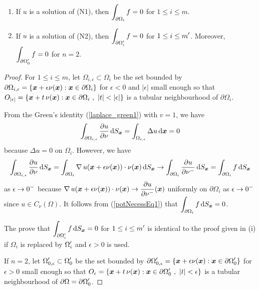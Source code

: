 \begin{prop} \label{pot_nec_Nprobl}
\begin{enumerate}
\item If $u$ is a solution of (N1), then
$\displaystyle \int_{\partial \Omega_i} f =0$ for $1 \leq i \leq m$.
\item If $u$ is a solution of (N2), then
$\displaystyle \int_{\partial \Omega^{\prime}_i} f =0$ for
$\displaystyle 1 \leq i \leq m^{\prime}$.
Moreover, $\displaystyle \int_{\partial \Omega^{\prime}_0} f =0$ for $n=2$.
\end{enumerate}
\end{prop}

\begin{proof}
For $1\leq i \leq m$, let $\Omega_{i,\epsilon} \subset \Omega_i$ be
the set bounded by
$\displaystyle \partial \Omega_{i,\epsilon}
= \{{\bm{x}} + \epsilon \nu({\bm{x}}) : {\bm{x}}
\in \partial \Omega_i \}$ for $\epsilon<0$ and $|\epsilon|$ small
enough so that
$\DS
O_{|\epsilon|} = \left\{ \VEC{x} + t\, \nu(\VEC{x}) : \VEC{x} \in
  \partial \Omega_i \ , \ |t|<|\epsilon| \right\}$ is a tubular
neighbourhood of $\partial \Omega_i$.

From the Green's identity (\ref{laplace_green1}) with $v=1$, we have
\begin{equation} \label{potNecessEq1}
\int_{\partial \Omega_{i,\epsilon}} \frac{\partial{u}}{\partial \nu} \,\mathrm{d}{S}_{{\bm{x}}}
= \int_{\Omega_{i,\epsilon}} \Delta u \,\mathrm{d}{{\bm{x}}} = 0
\end{equation}
because $\Delta u = 0$ on $\Omega_i$.  However, we have
\[
\int_{\partial \Omega_{i,\epsilon}} \frac{\partial{u}}{\partial \nu} \,\mathrm{d}{S}_{{\bm{x}}}
= \int_{\partial \Omega_i} \operatorname{\nabla} u({\bm{x}} + \epsilon \nu({\bm{x}}))
\cdot \nu({\bm{x}}) \,\mathrm{d}{S}_{{\bm{x}}}
\rightarrow \int_{\partial \Omega_i} \frac{\partial{u}}{\partial \nu^-} \,\mathrm{d}{S}_{{\bm{x}}}
= \int_{\partial \Omega_i} f \,\mathrm{d}{S}_{{\bm{x}}}
\]
as $\displaystyle \epsilon \rightarrow 0^-$ because
$\displaystyle
\operatorname{\nabla} u({\bm{x}} + \epsilon \nu({\bm{x}})) \cdot \nu({\bm{x}})
\to \frac{\partial{u}}{\partial \nu^-}({\bm{x}})$ uniformly on $\partial \Omega_i$ as
$\displaystyle \epsilon \to 0^-$ since $u \in C_{\nu}(\Omega)$.  It follows
from (\ref{potNecessEq1}) that
$\displaystyle \int_{\partial \Omega_i} f \,\mathrm{d}{S}_{{\bm{x}}} = 0$.

 The prove that
$\displaystyle \int_{\partial \Omega^{\prime}_i} f \,\mathrm{d}{S}_{{\bm{x}}} = 0$ for
$\displaystyle 1 \leq i \leq m^{\prime}$ is identical to the proof given in
(i) if $\Omega_i$ is replaced by $\displaystyle \Omega_i^{\prime}$ and
$\epsilon >0$ is used.

If $n=2$, let
$\displaystyle \Omega^{\prime}_{0,\epsilon} \subset \Omega^{\prime}_0$ be
the set bounded by
$\displaystyle \partial \Omega^{\prime}_{0,\epsilon}
= \{ {\bm{x}} + \epsilon \nu({\bm{x}}) :
{\bm{x}} \in \partial \Omega^{\prime}_0 \}$ for $\epsilon>0$ small
enough so that
$\displaystyle
O_{\epsilon} = \left\{ {\bm{x}} + t\, \nu({\bm{x}}) : {\bm{x}} \in
  \partial \Omega_0^{\prime} \ , \ |t|<\epsilon \right\}$ is a tubular
neighbourhood of $\displaystyle \partial \Omega = \partial \Omega^{\prime}_0$.


\end{proof}
